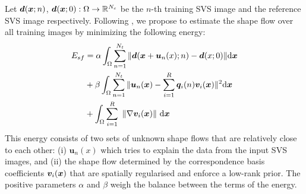 %


Let $\bm{d}(\boldsymbol{x};n)$, $\bm{d}(\boldsymbol{x};0):\Omega\rightarrow \mathbb{R}^{N_c}$ be the $n$-th training SVS image and the reference SVS image respectively. Following \cite{Garg:2013hu}, we propose to estimate the shape flow over all training images by minimizing the following energy:
\begin{align}
E_{sf} & =\alpha
\int_{\Omega}\sum_{n=1}^{N_t} \|\bm{d}(\boldsymbol{x}+\bm{u}_n(x);n)-\bm{d}(x;0)\| \mathrm{d} \boldsymbol{x} \label{eq:costfunc}\\
    &+ \beta \int_{\Omega}\sum_{n=1}^{N_t}\|\bm{u}_n(\boldsymbol{x})-\sum_{i=1}^R\bm{q}_i(n)\bm{v}_i(\boldsymbol{x})\|^2 \mathrm{d} \boldsymbol{x} \label{eq:lowrank}\\
    &+
\int_\Omega  \sum_{i=1}^R \,\, \left \|    \nabla \bm{v}_i(\boldsymbol{x})    \right \|  \,\mathrm{d} \boldsymbol{x} \label{eq:TVterm}
\end{align}
This energy consists of two sets of unknown shape flows that are relatively close to each other: (i) $\bm{u}_n(x)$ which tries to explain the data from the input SVS images, and (ii) the shape flow determined by the correspondence basis coefficients $\bm{v}_i(\boldsymbol{x})$ that are spatially regularised and enforce a low-rank prior. 
The positive parameters $\alpha$ and $\beta$ weigh the balance between the terms of the energy.

